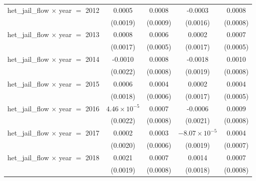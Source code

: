 \begin{tabular}{lcccc}
   het\_jail\_flow $\times$ year $=$ 2012                & 0.0005                 & 0.0008                    & -0.0003                & 0.0008\\   
                                                         & (0.0019)               & (0.0009)                  & (0.0016)               & (0.0008)\\   
   het\_jail\_flow $\times$ year $=$ 2013                & 0.0008                 & 0.0006                    & 0.0002                 & 0.0007\\   
                                                         & (0.0017)               & (0.0005)                  & (0.0017)               & (0.0005)\\   
   het\_jail\_flow $\times$ year $=$ 2014                & -0.0010                & 0.0008                    & -0.0018                & 0.0010\\   
                                                         & (0.0022)               & (0.0008)                  & (0.0019)               & (0.0008)\\   
   het\_jail\_flow $\times$ year $=$ 2015                & 0.0006                 & 0.0004                    & 0.0002                 & 0.0004\\   
                                                         & (0.0018)               & (0.0006)                  & (0.0017)               & (0.0005)\\   
   het\_jail\_flow $\times$ year $=$ 2016                & $4.46\times 10^{-5}$   & 0.0007                    & -0.0006                & 0.0009\\   
                                                         & (0.0022)               & (0.0008)                  & (0.0021)               & (0.0008)\\   
   het\_jail\_flow $\times$ year $=$ 2017                & 0.0002                 & 0.0003                    & $-8.07\times 10^{-5}$  & 0.0004\\   
                                                         & (0.0020)               & (0.0006)                  & (0.0019)               & (0.0007)\\   
   het\_jail\_flow $\times$ year $=$ 2018                & 0.0021                 & 0.0007                    & 0.0014                 & 0.0007\\   
                                                         & (0.0019)               & (0.0008)                  & (0.0018)               & (0.0008)\\   

\end{tabular}

